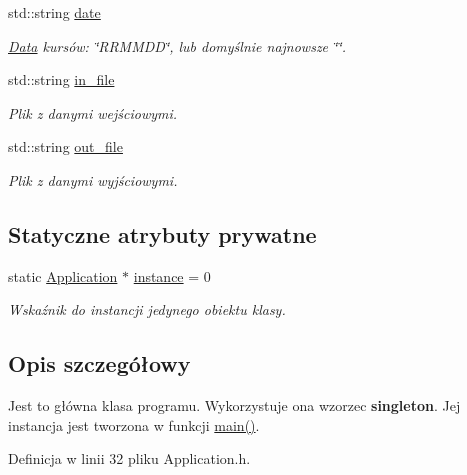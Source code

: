 \begin{DoxyCompactItemize}
std\-::string \hyperlink{class_application_a4e66f842b9681694c2c3a7ab402a3373}{date}
\begin{DoxyCompactList}\small\item\em \hyperlink{class_data}{\-Data} kursów\-: \char`\"{}\-R\-R\-M\-M\-D\-D\char`\"{}, lub domyślnie najnowsze \char`\"{}\char`\"{}. \end{DoxyCompactList}\item 
std\-::string \hyperlink{class_application_a2b3f25d468a1923a99ca00a17d613907}{in\-\_\-file}
\begin{DoxyCompactList}\small\item\em \-Plik z danymi wejściowymi. \end{DoxyCompactList}\item 
std\-::string \hyperlink{class_application_af3e196e2f013c693c29c3ac89a7631d1}{out\-\_\-file}
\begin{DoxyCompactList}\small\item\em \-Plik z danymi wyjściowymi. \end{DoxyCompactList}\end{DoxyCompactItemize}
\subsection*{\-Statyczne atrybuty prywatne}
\begin{DoxyCompactItemize}
\item 
static \hyperlink{class_application}{\-Application} $\ast$ \hyperlink{class_application_abd74a9391b24bd1a1586a1d8b88bb2d3}{instance} = 0
\begin{DoxyCompactList}\small\item\em \-Wskaźnik do instancji jedynego obiektu klasy. \end{DoxyCompactList}\end{DoxyCompactItemize}


\subsection{\-Opis szczegółowy}
\-Jest to główna klasa programu. \-Wykorzystuje ona wzorzec {\bfseries singleton}. \-Jej instancja jest tworzona w funkcji \hyperlink{main_8cpp_ac0f2228420376f4db7e1274f2b41667c}{main()}. 

\-Definicja w linii 32 pliku \-Application.\-h.



